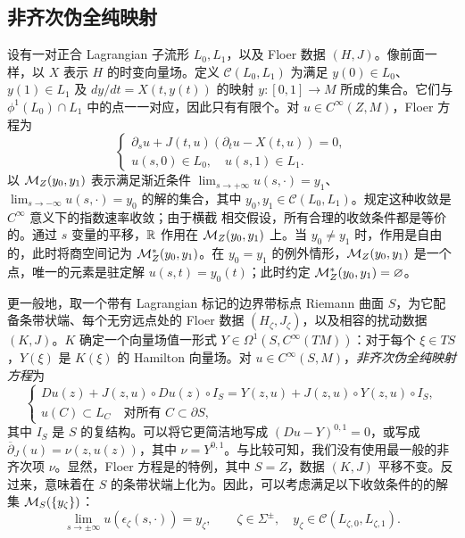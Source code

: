 \subsection{非齐次伪全纯映射}\label{sec:8f}
设有一对正合 Lagrangian 子流形 $L_0,L_1$，以及 Floer 数据 $(H,J)$。像前面一样，以 $X$ 表示 $H$ 的时变向量场。定义 $\mathcal C(L_0,L_1)$ 为满足 $y(0)\in L_0$、$y(1)\in L_1$ 及 $dy/dt=X(t,y(t))$ 的映射 $y:[0,1]\to M$ 所成的集合。它们与 $\phi^1(L_0)\cap L_1$ 中的点一一对应，因此只有有限个。对 $u\in C^\infty(Z,M)$，Floer 方程为
\begin{equation}\label{eq:8.8}
\begin{cases}
\partial_su+J(t,u)(\partial_tu-X(t,u))=0,\\
u(s,0)\in L_0,\quad u(s,1)\in L_1.
\end{cases}
\end{equation}
以 $\mathcal M_Z(y_0,y_1)$ 表示满足渐近条件 $\lim_{s\to+\infty}u(s,\cdot)=y_1$、$\lim_{s\to-\infty}u(s,\cdot)=y_0$ 的解的集合，其中 $y_0,y_1\in\mathcal C(L_0,L_1)$。规定这种收敛是 $C^\infty$ 意义下的指数速率收敛；由于横截
相交假设，所有合理的收敛条件都是等价的。通过 $s$ 变量的平移，$\mathbb R$ 作用在 $\mathcal M_Z(y_0,y_1)$ 上。当 $y_0\ne y_1$ 时，作用是自由的，此时将商空间记为 $\mathcal M_Z^*(y_0,y_1)$。在 $y_0=y_1$ 的例外情形，$\mathcal M_Z(y_0,y_1)$ 是一个点，唯一的元素是驻定解 $u(s,t)=y_0(t)$；此时约定 $\mathcal M_Z^*(y_0,y_1)=\varnothing$。

更一般地，取一个带有 Lagrangian 标记的边界带标点 Riemann 曲面 $S$，为它配备条带状端、每个无穷远点处的 Floer 数据 $(H_\zeta,J_\zeta)$，以及相容的扰动数据 $(K,J)$。$K$ 确定一个向量场值一形式 $Y\in\Omega^1(S,C^\infty(TM))$：对于每个 $\xi\in TS$，$Y(\xi)$ 是 $K(\xi)$ 的 Hamilton 向量场。对 $u\in C^\infty(S,M)$，\emph{非齐次伪全纯映射方程}为
\begin{equation}\label{eq:8.9}
\begin{cases}
Du(z)+J(z,u)\circ Du(z)\circ I_S
=Y(z,u)+J(z,u)\circ Y(z,u)\circ I_S,\\
u(C)\subset L_C\quad\text{对所有 }C\subset\partial S,
\end{cases}
\end{equation}
其中 $I_S$ 是 $S$ 的复结构。可以将它更简洁地写成 $(Du-Y)^{0,1}=0$，或写成 $\overline\partial_J(u)=\nu(z,u(z))$，其中 $\nu=Y^{0,1}$。与比较可知，我们没有使用最一般的非齐次项 $\nu$。显然，Floer 方程是的特例，其中 $S=Z$，数据 $(K,J)$ 平移不变。反过来，意味着在 $S$ 的条带状端上化为。因此，可以考虑满足以下收敛条件的的解集 $\mathcal M_S(\{y_\zeta\})$：
\begin{equation}\label{eq:8.10}
\lim_{s\to\pm\infty}u(\epsilon_\zeta(s,\cdot))=y_\zeta,
\qquad \zeta\in\Sigma^\pm,\quad y_\zeta\in\mathcal C(L_{\zeta,0},L_{\zeta,1}).
\end{equation}

